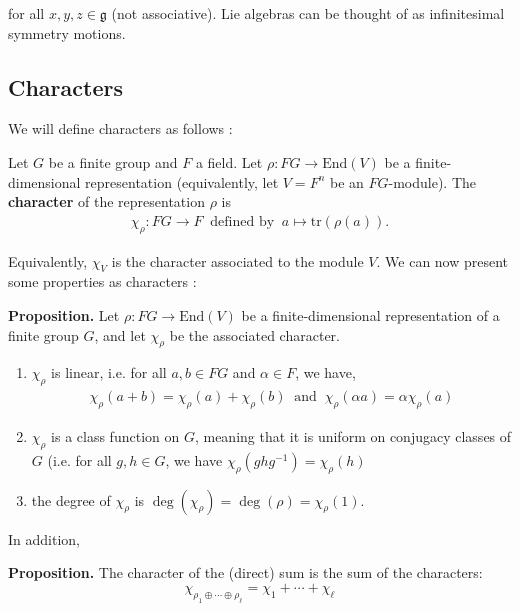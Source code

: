 \documentclass[11pt, reqno]{amsart}
\theoremstyle{plain}
\theoremstyle{definition}
\theoremstyle{example}
\def\End{\mathrm{End}}
\def\tr{\mathrm{tr}}
\begin{document}
for all $x,y,z \in \mathfrak{g}$ (not associative). Lie algebras can be thought of as infinitesimal symmetry motions.


\subsection{Characters}

We will define characters as follows \cite[Lec 23, p. 1]{dau}:

\par
Let $G$ be a finite group and $F$ a field. Let $\rho: FG \to \End(V)$ be a finite-dimensional representation (equivalently, let $V = F^n$ be an $FG$-module). The \textbf{character} of the representation $\rho$ is
\begin{align*}
\chi_{\rho}: FG \to F \; \; \text{defined by} \; \; a \mapsto \tr(\rho(a)).
\end{align*}

Equivalently, $\chi_{V}$ is the character associated to the module $V$. We can now present some properties as characters \cite[Lec 23, p. 2]{dau}:

\par
\textbf{Proposition.} Let $\rho: FG \to \End(V)$ be a finite-dimensional representation of a finite group $G$, and let $\chi_{\rho}$ be the associated character.
\begin{enumerate}
\item $\chi_{\rho}$ is linear, i.e. for all $a, b \in FG$ and $\alpha \in F$, we have,
\begin{align*}
\chi_{\rho}(a + b) = \chi_{\rho}(a) + \chi_{\rho}(b) \; \; \text{and} \; \; \chi_{\rho}(\alpha a) = \alpha \chi_{\rho}(a)
\end{align*}
\item $\chi_{\rho}$ is a class function on $G$, meaning that it is uniform on conjugacy classes of $G$ (i.e. for all $g, h \in G$, we have $\chi_{\rho}(ghg^{-1}) = \chi_{\rho}(h)$
\item the degree of $\chi_{\rho}$ is $\deg(\chi_{\rho}) = \deg(\rho) = \chi_{\rho}(1)$.
\end{enumerate}

In addition,

\par
\textbf{Proposition.} The character of the (direct) sum is the sum of the characters: $$\chi_{\rho_1 \oplus \cdots \oplus \rho_{\ell}} = \chi_1 + \cdots + \chi_{\ell}$$
\end{document}

